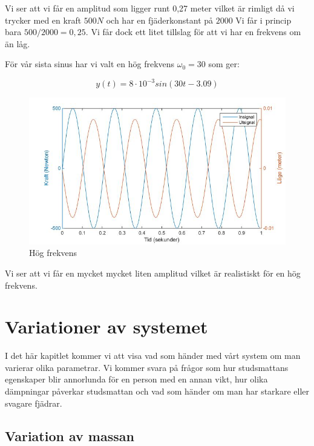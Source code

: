 \documentclass[10pt,a4paper]{article}
\begin{document}
\newpage
Vi ser att vi får en amplitud som ligger runt 0,27 meter vilket är rimligt då vi trycker med en kraft $500N$ och har en fjäderkonstant på $2000$ Vi får i princip bara $500/2000 = 0,25$. Vi får dock ett litet tillslag för att vi har en frekvens om än låg.

För vår sista sinus har vi valt en hög frekvens $\omega_0 = 30$ som ger:

\begin{equation}
y(t) = 8\cdot 10^{-3} sin(30 t - 3.09)
\end{equation}

\begin{figure}[h]
\begin{center}
\includegraphics[scale=0.4]{sinussvar3}
\caption{Hög frekvens}
\end{center}
\end{figure}

Vi ser att vi får en mycket mycket liten amplitud vilket är realistiskt för en hög frekvens.




\newpage
\section{Variationer av systemet}

I det här kapitlet kommer vi att visa vad som händer med vårt system om man varierar olika parametrar. Vi kommer svara på frågor som hur studsmattans egenskaper blir annorlunda för en person med en annan vikt, hur olika dämpningar påverkar studsmattan och vad som händer om man har starkare eller svagare fjädrar.



\subsection{Variation av massan}
\end{document}

